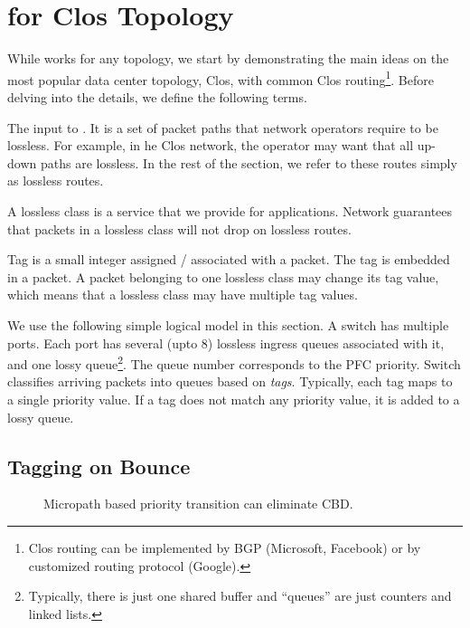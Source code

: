 \section{\sysname{} for Clos Topology}
\label{sec:specific}

While \sysname{} works for any topology, we start by demonstrating the main
ideas on the most popular data center topology, Clos, with common Clos
routing\footnote{Clos routing can be implemented by BGP (Microsoft, Facebook) or
by customized routing protocol (Google).}.  Before delving into the details, we
define the following terms.

 The input to \sysname{}. It is a set of packet paths
that network operators require to be lossless. For example, in he Clos network,
the operator may want that all up-down paths are lossless. In the rest of the
section, we refer to these routes simply as lossless routes.

 A lossless class is a service that we provide for
applications.  Network guarantees that packets in a lossless class will not drop
on lossless routes. 

 Tag is a small integer assigned / associated with a packet. The tag
is embedded in a packet. A packet belonging to one lossless class may change its
tag value, which means that a lossless class may have multiple tag values.

 We use the following simple logical model in this section.
A switch has multiple ports. Each port has several (upto 8) lossless ingress
queues associated with it, and one lossy queue\footnote{Typically, there is just
one shared buffer and ``queues'' are just counters and linked lists.}.  The
queue number corresponds to the PFC priority.  Switch classifies arriving
packets into queues based on {\em tags}. Typically, each tag maps to a single
priority value. If a tag does not match any priority value, it is added to a
lossy queue. 

\subsection{Tagging on Bounce}\label{subsec:tag}

\begin{figure}[t]
	\centering
	

	
	
	\caption{Micropath based priority transition can eliminate CBD.}\label{fig:priority_transition}
\end{figure}

